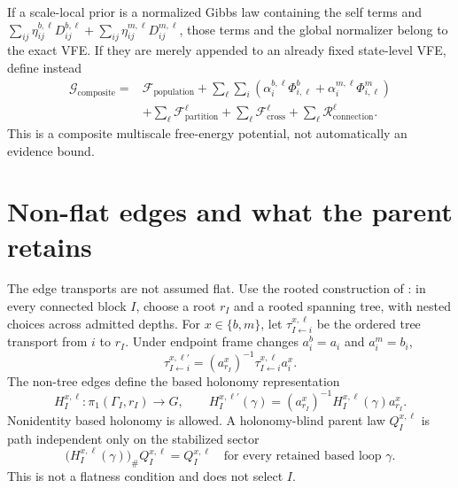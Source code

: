 If a scale-local prior is a normalized Gibbs law containing the self terms and
$\sum_{ij}\eta_{ij}^{b,\ell}D_{ij}^{b,\ell}
+\sum_{ij}\eta_{ij}^{m,\ell}D_{ij}^{m,\ell}$, those terms and the global normalizer
belong to the exact VFE. If they are merely appended to an already fixed
state-level VFE, define instead
\begin{align}
\mathcal G_{\mathrm{composite}}
={}&\mathcal F_{\mathrm{population}}
+\sum_\ell\sum_i\left(
\alpha_i^{b,\ell}\Phi_{i,\ell}^b
+\alpha_i^{m,\ell}\Phi_{i,\ell}^m\right)
\nonumber\\
&+\sum_\ell\mathcal F_{\mathrm{partition}}^\ell
+\sum_\ell\mathcal F_{\mathrm{cross}}^\ell
+\sum_\ell\mathcal R_{\mathrm{connection}}^\ell.
\label{eq:full-graph-composite-potential}
\end{align}
This is a composite multiscale free-energy potential, not automatically an
evidence bound. 

\section{Non-flat edges and what the parent retains}
\label{sec:full-graph-vfe-nonflat}

The edge transports are not assumed flat. Use the rooted construction of
: in every connected block $I$, choose a root
$r_I$ and a rooted spanning tree, with nested choices across admitted depths.
For $x\in\{b,m\}$, let $\tau_{I\leftarrow i}^{x,\ell}$ be the ordered tree
transport from $i$ to $r_I$. Under endpoint frame changes $a_i^b=a_i$ and
$a_i^m=b_i$,
\begin{equation}
\tau_{I\leftarrow i}^{x,\ell\prime}
=(a_{r_I}^x)^{-1}\tau_{I\leftarrow i}^{x,\ell}a_i^x.
\label{eq:full-graph-tree-transport-law}
\end{equation}
The non-tree edges define the based holonomy representation
\begin{equation}
H_I^{x,\ell}:\pi_1(\Gamma_I,r_I)\longrightarrow G,
\qquad
H_I^{x,\ell\prime}(\gamma)
=(a_{r_I}^x)^{-1}H_I^{x,\ell}(\gamma)a_{r_I}^x.
\label{eq:full-graph-based-holonomy}
\end{equation}
Nonidentity based holonomy is allowed. A holonomy-blind parent law
$Q_I^{x,\ell}$ is path independent only on the stabilized sector
\begin{equation}
\bigl(H_I^{x,\ell}(\gamma)\bigr)_\#Q_I^{x,\ell}=Q_I^{x,\ell}
\quad\text{for every retained based loop }\gamma.
\label{eq:full-graph-holonomy-stabilization}
\end{equation}
This is not a flatness condition and does not select $I$.

